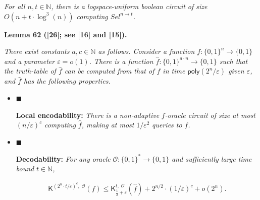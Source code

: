 \emph{For all $n,t\in\mathbb{N}$, there is a logspace-uniform boolean circuit of size $O(n+t\cdot\log^{3}(n))$ computing $Sel^{n\to t}$.}\par







\par\medskip\noindent\textbf{
\textbf{Lemma 62}\textbf{ }([26]; see [16] and [15])\textbf{.}
}\par



\emph{There exist constants $a,c\in\mathbb{N}$ as follows. Consider a function $f:\{0,1\}^{n}\to\{0,1\}$ and a parameter $\varepsilon=o(1)$. There is a function $\hat{f}:\{0,1\}^{a\cdot n}\to\{0,1\}$ such that the truth-table of $\hat{f}$ can be computed from that of $f$ in time ${\mathsf{poly}}(2^{n}/\varepsilon)$ given $\varepsilon$, and $\hat{f}$ has the following properties.}\par


\begin{itemize}


\item[] 
$\blacksquare$ 


\textbf{Local encodability:}\emph{ There is a non-adaptive }$f$\emph{-oracle circuit of size at most }$(n/\varepsilon)^{c}$\emph{ computing }$\hat{f}$\emph{, making at most }$1/\varepsilon^{2}$\emph{ queries to }$f$\emph{.}\par





\item[] 
$\blacksquare$ 


\textbf{Decodability:}\emph{ For any oracle }$\mathcal{O}:\{0,1\}^{*}\to\{0,1\}$\emph{ and sufficiently large time bound }$t\in\mathbb{N}$\emph{,}\par


\[\begin{gathered}
{\mathsf{K}}^{(2^{n}\cdot t/\varepsilon)^{c},\;\mathcal{O}}(f)\leq{\mathsf{K}}^{t,\;\mathcal{O}}_{\frac{1}{2}+\varepsilon}(\hat{f})+2^{n/2}\cdot(1/\varepsilon)^{c}+o(2^{n}).
\end{gathered}\]





\end{itemize}



